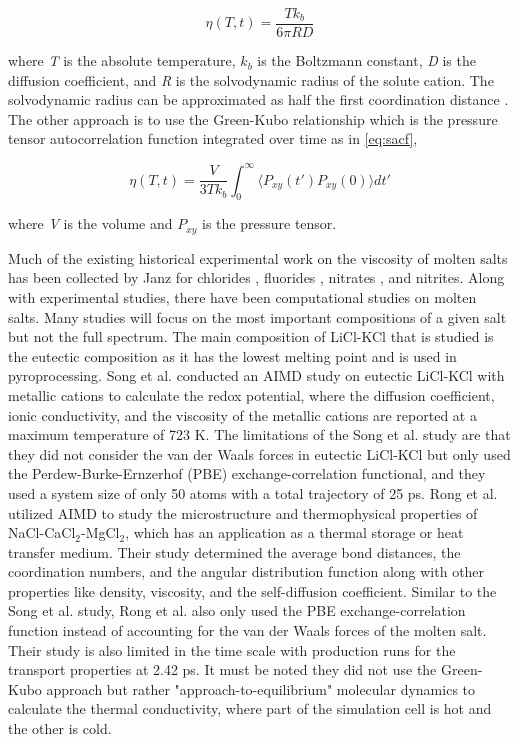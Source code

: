 \documentclass[review]{elsarticle}
\begin{document}
\begin{equation}
  \label{eq:SES}
     \eta(T,t) = \frac{Tk_b}{6\pi RD}
\end{equation}

\noindent where \textit{T} is the absolute temperature, \textit{$k_b$} is the Boltzmann constant, \textit{D} is the diffusion coefficient, and \textit{R} is the solvodynamic radius of the solute cation. The solvodynamic radius can be approximated as half the first coordination distance \cite{SONG2017462}. The other approach is to use the Green-Kubo relationship which is the pressure tensor autocorrelation function integrated over time \cite{rapaport2004art} as in \cref{eq:sacf},

\begin{equation}
  \label{eq:sacf}
     \eta(T,t) = \frac{V}{3Tk_b}\int_0^\infty \langle P_{xy}(t')P_{xy}(0)\rangle dt'
\end{equation}

\noindent where \textit{V} is the volume and \textit{$P_{xy}$} is the pressure tensor.

Much of the existing historical experimental work on the viscosity of molten salts has been collected by Janz for chlorides \cite{janz_visc}, fluorides \cite{janz1974molten}, nitrates \cite{janz1972molten}, and nitrites\cite{janz1972molten}. Along with experimental studies, there have been computational studies on molten salts. Many studies will focus on the most important compositions of a given salt but not the full spectrum. The main composition of LiCl-KCl that is studied is the eutectic composition as it has the lowest melting point and is used in pyroprocessing. Song et al. \cite{SONG2017462} conducted an AIMD study on eutectic LiCl-KCl with metallic cations to calculate the redox potential, where the diffusion coefficient, ionic conductivity, and the viscosity of the metallic cations are reported at a maximum temperature of 723 K. The limitations of the Song et al. study are that they did not consider the van der Waals forces in eutectic LiCl-KCl but only used the Perdew-Burke-Ernzerhof (PBE) \cite{PBE1996} exchange-correlation functional, and they used a system size of only 50 atoms with a total trajectory of 25 ps. Rong et al. \cite{RONG2020110696} utilized AIMD to study the microstructure and thermophysical properties of NaCl-CaCl$_2$-MgCl$_2$, which has an application as a thermal storage or heat transfer medium. Their study determined the average bond distances, the coordination numbers, and the angular distribution function along with other properties like density, viscosity, and the self-diffusion coefficient. Similar to the Song et al. study, Rong et al. also only used the PBE exchange-correlation function instead of accounting for the van der Waals forces of the molten salt. Their study is also limited in the time scale with production runs for the transport properties at 2.42 ps. It must be noted they did not use the Green-Kubo approach but rather "approach-to-equilibrium" molecular dynamics to calculate the thermal conductivity, where part of the simulation cell is hot and the other is cold.
\end{document}
